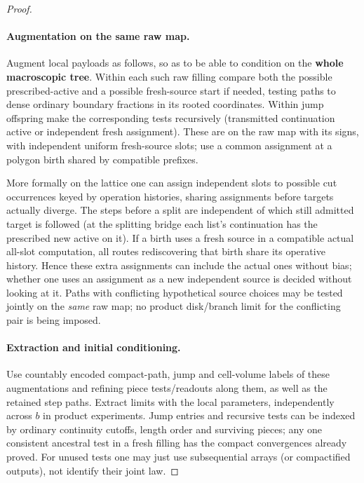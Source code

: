 \begin{proof}
\paragraph{Augmentation on the same raw map.}

Augment local payloads as follows, so as to be able to condition on the \textbf{whole macroscopic tree}.
Within each such raw filling compare both the possible prescribed-active and a possible fresh-source start
if needed, testing paths to dense ordinary boundary fractions in its rooted coordinates. Within jump
offspring make the corresponding tests recursively (transmitted continuation active or independent fresh
assignment). These are on the raw map with its signs, with independent uniform fresh-source slots; use a
common assignment at a polygon birth shared by compatible prefixes.

More formally on the lattice one can
assign independent slots to possible cut occurrences keyed by operation histories, sharing assignments
before targets actually diverge. The steps before a split are independent of which still admitted target is
followed (at the splitting bridge each list's continuation has the prescribed new active on it). If a birth
uses a fresh source in a compatible actual all-slot computation, all routes rediscovering that birth share
its operative history. Hence these extra assignments can include the actual ones without bias; whether one
uses an assignment as a new independent source is decided without looking at it. Paths with conflicting
hypothetical source choices may be tested jointly on the \emph{same} raw map; no product disk/branch limit
for the conflicting pair is being imposed.

\paragraph{Extraction and initial conditioning.}

Use countably encoded compact-path, jump and cell-volume labels of these augmentations and refining piece
tests/readouts along them, as well as the retained step paths. Extract limits with the local parameters,
independently across \(b\) in product experiments. Jump entries and recursive tests can be indexed by
ordinary continuity cutoffs, length order and surviving pieces; any one consistent ancestral test in a fresh
filling has the compact convergences already proved. For unused tests one may just use subsequential arrays
(or compactified outputs), not identify their joint law.


\end{proof}
